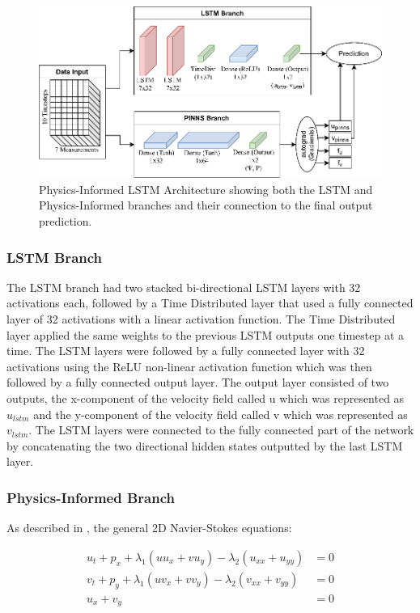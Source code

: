 \begin{figure}[H] \label{fig:physics_lstm_architecture} \centering
    \includegraphics[width=\linewidth]{figures/physics_lstm_architecture.png}
    \caption{Physics-Informed LSTM Architecture showing both the LSTM and Physics-Informed branches and their connection to the final output prediction.}
\end{figure}

\subsubsection{LSTM Branch}
The LSTM branch had two stacked bi-directional LSTM layers with 32 activations each, followed by a Time Distributed layer that used a fully connected layer of 32 activations with a linear activation function. The Time Distributed layer applied the same weights to the previous LSTM outputs one timestep at a time. The LSTM layers were followed by a fully connected layer with 32 activations using the ReLU \cite{ReLU} non-linear activation function which was then followed by a fully connected output layer. The output layer consisted of two outputs, the x-component of the velocity field called u which was represented as $u_{lstm}$ and the y-component of the velocity field called v which was represented as $v_{lstm}$. The LSTM layers were connected to the fully connected part of the network by concatenating the two directional hidden states outputted by the last LSTM layer.

\subsubsection{Physics-Informed Branch}
As described in \cite{PINNS}, the general 2D Navier-Stokes equations:

\begin{equation} \label{eq:navier_stokes}
\begin{split}
    u_t + p_x + \lambda_1 (uu_x + vu_y) - \lambda_2 (u_{xx} + u_{yy}) &= 0 \\
    v_t + p_y + \lambda_1 (uv_x + vv_y) - \lambda_2 (v_{xx} + v_{yy}) &= 0 \\
    u_x + v_y &= 0
\end{split}
\end{equation}

